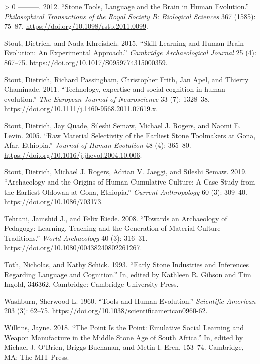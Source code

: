 \documentclass[smallextended]{svjour3}       %
\newlength{\cslhangindent}
\newenvironment{CSLReferences}[3] %
 {%
  \setlength{\parindent}{0pt}
  \ifodd #1 \everypar{\setlength{\hangindent}{\cslhangindent}}\ignorespaces\fi
  \ifnum #2 > 0
  \setlength{\parskip}{#3\baselineskip}
  \fi
 }%
 {}
\begin{document}
\begin{CSLReferences}{1}{0}
\leavevmode\hypertarget{ref-stout2012}{}%
---------. 2012. {``Stone Tools, Language and the Brain in Human
Evolution.''} \emph{Philosophical Transactions of the Royal Society B:
Biological Sciences} 367 (1585): 75--87.
\url{https://doi.org/10.1098/rstb.2011.0099}.

\leavevmode\hypertarget{ref-stout2015}{}%
Stout, Dietrich, and Nada Khreisheh. 2015. {``Skill Learning and Human
Brain Evolution: An Experimental Approach.''} \emph{Cambridge
Archaeological Journal} 25 (4): 867--75.
\url{https://doi.org/10.1017/S0959774315000359}.

\leavevmode\hypertarget{ref-stout2011}{}%
Stout, Dietrich, Richard Passingham, Christopher Frith, Jan Apel, and
Thierry Chaminade. 2011. {``Technology, expertise and social cognition
in human evolution.''} \emph{The European Journal of Neuroscience} 33
(7): 1328--38. \url{https://doi.org/10.1111/j.1460-9568.2011.07619.x}.

\leavevmode\hypertarget{ref-stout2005}{}%
Stout, Dietrich, Jay Quade, Sileshi Semaw, Michael J. Rogers, and Naomi
E. Levin. 2005. {``Raw Material Selectivity of the Earliest Stone
Toolmakers at Gona, Afar, Ethiopia.''} \emph{Journal of Human Evolution}
48 (4): 365--80. \url{https://doi.org/10.1016/j.jhevol.2004.10.006}.

\leavevmode\hypertarget{ref-stout2019}{}%
Stout, Dietrich, Michael J. Rogers, Adrian V. Jaeggi, and Sileshi Semaw.
2019. {``Archaeology and the Origins of Human Cumulative Culture: A Case
Study from the Earliest Oldowan at Gona, Ethiopia.''} \emph{Current
Anthropology} 60 (3): 309--40. \url{https://doi.org/10.1086/703173}.

\leavevmode\hypertarget{ref-tehrani2008}{}%
Tehrani, Jamshid J., and Felix Riede. 2008. {``Towards an Archaeology of
Pedagogy: Learning, Teaching and the Generation of Material Culture
Traditions.''} \emph{World Archaeology} 40 (3): 316--31.
\url{https://doi.org/10.1080/00438240802261267}.

\leavevmode\hypertarget{ref-toth1993}{}%
Toth, Nicholas, and Kathy Schick. 1993. {``Early Stone Industries and
Inferences Regarding Language and Cognition.''} In, edited by Kathleen
R. Gibson and Tim Ingold, 346362. Cambridge: Cambridge University Press.

\leavevmode\hypertarget{ref-washburn1960}{}%
Washburn, Sherwood L. 1960. {``Tools and Human Evolution.''}
\emph{Scientific American} 203 (3): 62--75.
\url{https://doi.org/10.1038/scientificamerican0960-62}.

\leavevmode\hypertarget{ref-wilkins2018}{}%
Wilkins, Jayne. 2018. {``The Point Is the Point: Emulative Social
Learning and Weapon Manufacture in the Middle Stone Age of South
Africa.''} In, edited by Michael J. O'Brien, Briggs Buchanan, and Metin
I. Eren, 153--74. Cambridge, MA: The MIT Press.


\end{CSLReferences}
\end{document}
